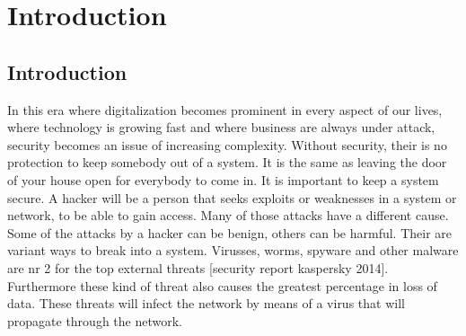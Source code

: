 \chapter{Introduction}
\label{cha:10}
%


\section{Introduction}



In this era where digitalization becomes prominent in every aspect of our lives, where technology is growing fast and where business are always under attack, security becomes an issue of increasing complexity. Without security, their is no protection to keep somebody out of a system. It is the same as leaving the door of your house open for everybody to come in. It is important to keep a system secure.  A hacker will be a person that seeks exploits or weaknesses in a system or network, to be able to gain access.  Many of those attacks have a different cause. Some of the attacks by a hacker can be benign, others can be harmful. Their are variant ways to break into a system. Virusses, worms, spyware and other malware are nr 2 for the top external threats [security report kaspersky 2014]. Furthermore these kind of threat also causes the greatest percentage in loss of data. These threats will infect the network by means of a virus that will propagate through the network. 

